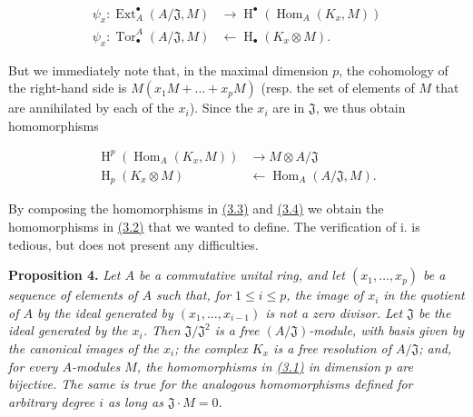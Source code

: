 \documentclass{article}
\newenvironment{itenv}[1]
  {\phantomsection\par\smallskip\noindent\textbf{#1.}\itshape}
  {\par\smallskip}
\newenvironment{eqenv}
  {}
  {}
\newcommand{\oldpage}[1]{\marginpar{\footnotesize$\Big\vert$ \textit{p.~#1}}}
\theoremstyle{definition}
\theoremstyle{definition}
\theoremstyle{definition}
\theoremstyle{definition}
\theoremstyle{remark}
\begin{document}
\leavevmode{}%
\begin{eqenv}
\[
  \begin{aligned}
    \psi_x\colon \operatorname{Ext}_A^\bullet(A/{\mathfrak{J}},M) &\to \operatorname{H}^\bullet(\operatorname{Hom}_A(K_x,M))
  \\\psi_x\colon \operatorname{Tor}_\bullet^A(A/{\mathfrak{J}},M) &\leftarrow\operatorname{H}_\bullet(K_x\otimes M).
  \end{aligned}
\tag{3.3}
\]

\end{eqenv}

But we immediately note that, in the maximal dimension \(p\), the cohomology of the right-hand side is \(M(x_1M+\ldots+x_pM)\) (resp. the set of elements of \(M\) that are annihilated by each of the \(x_i\)).
Since the \(x_i\) are in \({\mathfrak{J}}\), we thus obtain homomorphisms

\leavevmode{}%
\begin{eqenv}
\[
  \begin{aligned}
    \operatorname{H}^p(\operatorname{Hom}_A(K_x,M)) &\to M\otimes A/{\mathfrak{J}}
  \\\operatorname{H}_p(K_x\otimes M) &\leftarrow\operatorname{Hom}_A(A/{\mathfrak{J}},M).
  \end{aligned}
\tag{3.4}
\]

\end{eqenv}

By composing the homomorphisms in \protect\hyperlink{fga-1-equation-3.3}{(3.3)} and \protect\hyperlink{fga-1-equation-3.4}{(3.4)} we obtain the homomorphisms in \protect\hyperlink{fga-1-equation-3.2}{(3.2)} that we wanted to define.
The verification of i. is tedious, but does not present any difficulties.

\leavevmode{}%
\begin{itenv}{Proposition 4}
\oldpage{149-07}Let \(A\) be a commutative unital ring, and let \((x_1,\ldots,x_p)\) be a sequence of elements of \(A\) such that, for \(1\leqslant i\leqslant p\), the image of \(x_i\) in the quotient of \(A\) by the ideal generated by \((x_1,\ldots,x_{i-1})\) is not a zero divisor.
Let \({\mathfrak{J}}\) be the ideal generated by the \(x_i\).
Then \({\mathfrak{J}}/{\mathfrak{J}}^2\) is a free \((A/{\mathfrak{J}})\)-module, with basis given by the canonical images of the \(x_i\);
the complex \(K_x\) is a free resolution of \(A/{\mathfrak{J}}\);
and, for every \(A\)-modules \(M\), the homomorphisms in \protect\hyperlink{fga-1-equation-3.1}{(3.1)} in dimension \(p\) are bijective.
The same is true for the analogous homomorphisms defined for arbitrary degree \(i\) as long as \({\mathfrak{J}}\cdot M=0\).

\end{itenv}
\end{document}
